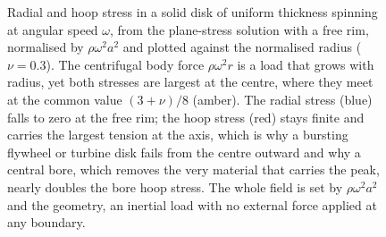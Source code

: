 \begin{figure}[htbp]
\centering
{}
\caption[Stress in a spinning disk]{Radial and hoop stress in a solid disk
of uniform thickness spinning at angular speed $\omega$, from the plane-stress
solution with a free rim, normalised by $\rho\omega^2 a^2$ and plotted against
the normalised radius ($\nu=0.3$). The centrifugal body force $\rho\omega^2 r$
is a load that grows with radius, yet both stresses are largest at the centre,
where they meet at the common value $(3+\nu)/8$ (amber). The radial stress
(blue) falls to zero at the free rim; the hoop stress (red) stays finite and
carries the largest tension at the axis, which is why a bursting flywheel or
turbine disk fails from the centre outward and why a central bore, which
removes the very material that carries the peak, nearly doubles the bore hoop
stress. The whole field is set by $\rho\omega^2 a^2$ and the geometry, an
inertial load with no external force applied at any boundary.}
\label{fig:vol03ch09:spinning-disk}
\end{figure}
